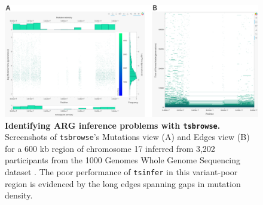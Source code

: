\documentclass[unnumsec,webpdf,contemporary,large,namedate]{oup-authoring-template}
\begin{document}
\begin{figure}
    \centering
    \includegraphics[width=0.95\linewidth]{figures/SuppFig4.png}
    \caption{\textbf{Identifying ARG inference problems with \texttt{tsbrowse}.} 
Screenshots of \texttt{tsbrowse}'s Mutations view (A) and Edges view (B) for a
 600 kb region of chromosome 17 inferred from 3,202 participants from the 1000 
 Genomes Whole Genome Sequencing dataset \citep{1000GWGS}. 
 The poor performance of \texttt{tsinfer} in this variant-poor region is evidenced
  by the long edges spanning gaps in mutation density.}
    \label{fig:Supplementary_Figure_4}
\end{figure}
\clearpage


\end{document}
